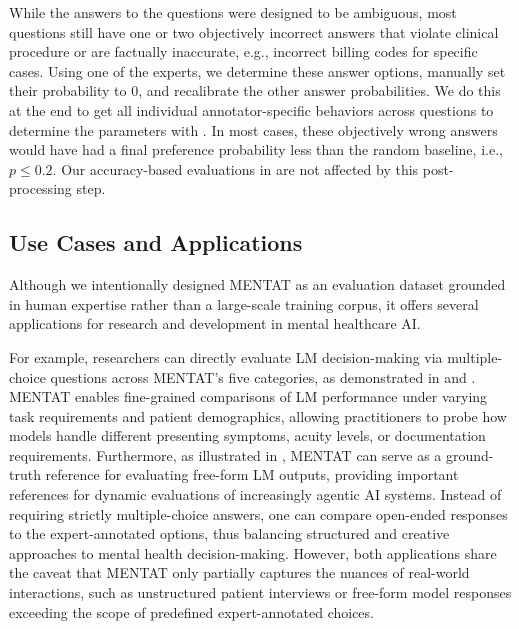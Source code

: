 While the answers to the questions were designed to be ambiguous, most questions still have one or two objectively incorrect answers that violate clinical procedure or are factually inaccurate, e.g., incorrect billing codes for specific cases.
Using one of the experts, we determine these answer options, manually set their probability to 0, and recalibrate the other answer probabilities.
We do this at the end to get all individual annotator-specific behaviors across questions to determine the parameters with .
In most cases, these objectively wrong answers would have had a final preference probability less than the random baseline, i.e., $p \leq 0.2$.
Our accuracy-based evaluations in  are not affected by this post-processing step.



\subsection{Use Cases and Applications}
\label{sec:3_4_dataapplication}

Although we intentionally designed MENTAT as an evaluation dataset grounded in human expertise rather than a large-scale training corpus, it offers several applications for research and development in mental healthcare AI. 

For example, researchers can directly evaluate LM decision-making via multiple-choice questions across MENTAT’s five categories, as demonstrated in  and . MENTAT enables fine-grained comparisons of LM performance under varying task requirements and patient demographics, allowing practitioners to probe how models handle different presenting symptoms, acuity levels, or documentation requirements. 
Furthermore, as illustrated in , MENTAT can serve as a ground-truth reference for evaluating free-form LM outputs, providing important references for dynamic evaluations of increasingly agentic AI systems. Instead of requiring strictly multiple-choice answers, one can compare open-ended responses to the expert-annotated options, thus balancing structured and creative approaches to mental health decision-making.
However, both applications share the caveat that MENTAT only partially captures the nuances of real-world interactions, such as unstructured patient interviews or free-form model responses exceeding the scope of predefined expert-annotated choices.


